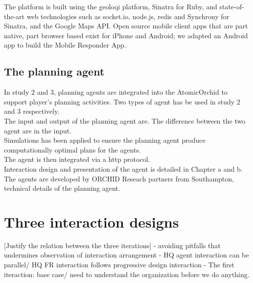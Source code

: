The platform is built using the geoloqi platform, Sinatra for Ruby, and state-of-the-art web technologies such as socket.io, node.js, redis and Synchrony for Sinatra, and the Google Maps API. Open source mobile client apps that are part native, part browser based exist for iPhone and Android; we adapted an Android app to build the Mobile Responder App.\\


\subsection{The planning agent}

In study 2 and 3, planning agents are integrated into the AtomicOrchid to support player's planning activities. Two types of agent has be used in study 2 and 3 respectively. \\

The input and output of the planning agent are. The difference between the two agent are in the input. \\

Simulations has been applied to ensure the planning agent produce computationally optimal plans for the agents.\\

The agent is then integrated via a http protocol. \\

Interaction design and presentation of the agent is detailed in Chapter a and b.\\

The agents are developed by ORCHID Reseach partners from Southampton, technical details of the planning agent.\\





\section{Three interaction designs}

[Justify the relation between the three iterations]
- avoiding pitfalls that undermines observation of interaction arrangement
- HQ agent interaction can be parallel/ HQ FR interaction follows progressive design interaction
- The first iteraction: base case/ need to understand the organization before we do anything.

